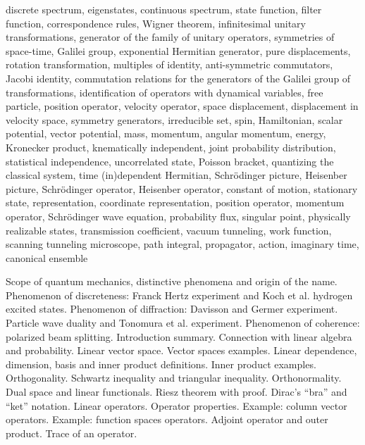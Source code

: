 \begin{multicols}{3}
  discrete spectrum,
  eigenstates,
  continuous spectrum,
  state function,
  filter function,
  correspondence rules,
  Wigner theorem,
  infinitesimal unitary transformations,
  generator of the family of unitary operators,
  symmetries of space-time,
  Galilei group,
  exponential Hermitian generator,
  pure displacements,
  rotation transformation,
  multiples of identity,
  anti-symmetric commutators,
  Jacobi identity,
  commutation relations for the generators of the Galilei group of transformations,
  identification of operators with dynamical variables,
  free particle,
  position operator,
  velocity operator,
  space displacement,
  displacement in velocity space,
  symmetry generators,
  irreducible set,
  spin,
  Hamiltonian,
  scalar potential,
  vector potential,
  mass,
  momentum,
  angular momentum,
  energy,
  Kronecker product,
  knematically independent,
  joint probability distribution,
  statistical independence,
  uncorrelated state,
  Poisson bracket,
  quantizing the classical system,
  time (in)dependent Hermitian,
  Schr\"odinger picture,
  Heisenber picture,
  Schr\"odinger operator,
  Heisenber operator,
  constant of motion,
  stationary state,
  representation,
  coordinate representation,
  position operator,
  momentum operator,
  Schr\"odinger wave equation,
  probability flux,
  singular point,
  physically realizable states,
  transmission coefficient,
  vacuum tunneling,
  work function,
  scanning tunneling microscope,
  path integral,
  propagator,
  action,
  imaginary time,
  canonical ensemble  
\end{multicols}

\begin{multicols}{3}
  Scope of quantum mechanics, distinctive phenomena and origin of the name.
  Phenomenon of discreteness: Franck Hertz experiment and Koch et al. hydrogen excited states.
  Phenomenon of diffraction: Davisson and Germer experiment.
  Particle wave duality and Tonomura et al. experiment.
  Phenomenon of coherence: polarized beam splitting.
  Introduction summary.
  Connection with linear algebra and probability. Linear vector space.
  Vector spaces examples. Linear dependence, dimension, basis and inner product definitions.
  Inner product examples. Orthogonality. Schwartz inequality and triangular inequality. Orthonormality.
  Dual space and linear functionals.
  Riesz theorem with proof.
  Dirac's ``bra'' and ``ket'' notation. Linear operators.
  Operator properties. Example: column vector operators.
  Example: function spaces operators.
  Adjoint operator and outer product.
  Trace of an operator.
  
\end{multicols}

\begin{multicols}{3}
  
\end{multicols}



